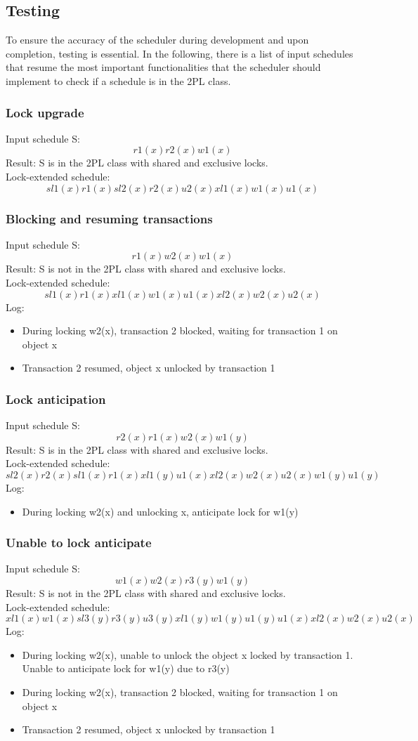 \documentclass{article}
\begin{document}
\subsection{Testing}
To ensure the accuracy of the scheduler during development and upon completion, testing is essential. In the following, there is a list of input schedules that resume the most important functionalities that the scheduler should implement to check if a schedule is in the 2PL class.  
\subsubsection{Lock upgrade}
Input schedule S:
$$r1(x) r2(x) w1(x)$$
Result: S is in the 2PL class with shared and exclusive locks.
\\
Lock-extended schedule:
$$sl1(x) r1(x) sl2(x) r2(x) u2(x) xl1(x) w1(x) u1(x)$$
\subsubsection{Blocking and resuming transactions}
Input schedule S:
$$r1(x) w2(x) w1(x)$$
Result: S is not in the 2PL class with shared and exclusive locks.
\\
Lock-extended schedule:
$$sl1(x) r1(x) xl1(x) w1(x) u1(x) xl2(x) w2(x) u2(x)$$
Log:
\begin{itemize}
    \item During locking w2(x), transaction 2 blocked, waiting for transaction 1 on object x
    \item Transaction 2 resumed, object x unlocked by transaction 1
\end{itemize}
\subsubsection{Lock anticipation}
Input schedule S:
$$r2(x) r1(x) w2(x) w1(y)$$
Result: S is in the 2PL class with shared and exclusive locks.
\\
Lock-extended schedule:
$$sl2(x) r2(x) sl1(x) r1(x) xl1(y) u1(x) xl2(x) w2(x) u2(x) w1(y) u1(y)$$
Log:
\begin{itemize}
    \item During locking w2(x) and unlocking x, anticipate lock for w1(y)
\end{itemize}
\subsubsection{Unable to lock anticipate}
Input schedule S:
$$w1(x) w2(x) r3(y) w1(y)$$
Result: S is not in the 2PL class with shared and exclusive locks.
\\
Lock-extended schedule:
$$xl1(x) w1(x) sl3(y) r3(y) u3(y) xl1(y) w1(y) u1(y) u1(x) xl2(x) w2(x) u2(x)$$
Log:
\begin{itemize}
    \item During locking w2(x), unable to unlock the object x locked by transaction 1. Unable to anticipate lock for w1(y) due to r3(y)
    \item During locking w2(x), transaction 2 blocked, waiting for transaction 1 on object x
    \item Transaction 2 resumed, object x unlocked by transaction 1
\end{itemize}
\end{document}
